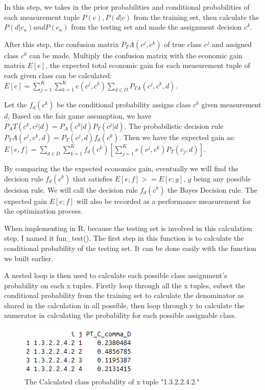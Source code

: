 \documentclass{article}
\begin{document}
\begin{multicols}{2}
        In this step, we takes in the prior probabilities and conditional probabilities of each measurement tuple $P(c), P(d|c)$ from the training set, then calculate the $P(d|c_n) and P(c_n)$ from the testing set and made the assignment decision $c^k$.

        After this step, the confusion matrix $P_TA(c^j, c^k)$ of true class $c^j$ and assigned class $c^k$ can be made. Multiply the confusion matrix with the economic gain matrix $E[e]$, the expected total economic gain for each measurement tuple of each given class can be calculated:  $E[e] = \sum_{j=1}^K\sum_{k=1}^K e(c^j, c^k) \sum_{d\in{D}}P_{TA}(c^j, c^k, d)$. 

        Let the $f_d(c^k)$ be the conditional probability assigns class $c^k$ given measurement $d$, Based on the fair game assumption, we have $P_AT(c^k, c^j|d) = P_A(c^k|d)P_T(c^j|d)$. The probabilistic decision rule $P_TA(c^j, c^k,d) = P_T(c^j,d)f_d(c^k)$. Then we have the expected gain as: $E[e,f] = \sum_{d\in D}\sum_{k=1}^K f_d(c^k)[ \sum_{j=1}^K e(c^j, c^k) P_T(c_j, d)]$. 

        By comparing the the expected economics gain, eventually we will find the decision rule $f_d(c^k)$ that satisfies $E[e;f] >= E[e;g]$, $g$ being any possible decision rule. We will call the decision rule $f_d(c^k)$ the Bayes Decision rule. The expected gain $E[e;f]$ will also be recorded as a performance measurement for the optimization process.     

        When implementing in R, because the testing set is involved in this calculation step, I named it fun\_test(). The first step in this function is to calculate the conditional probability of the testing set. It can be done easily with the function we built earlier. 

        A nested loop is then used to calculate each possible class assignment's probability on each x tuples. Firstly loop through all the x tuples, subset the conditional probability from the training set to calculate the denominator as shared in the calculation in all possible, then loop through y to calculate the numerator in calculating the probability for each possible assignable class. 

        \begin{figure}[H]
            \centering 
            \includegraphics[width=\linewidth]{fig8.png}
            \caption{The Calculated class probability of x tuple "1.3.2.2.4.2."}
        \end{figure}


\end{multicols}
\end{document}
